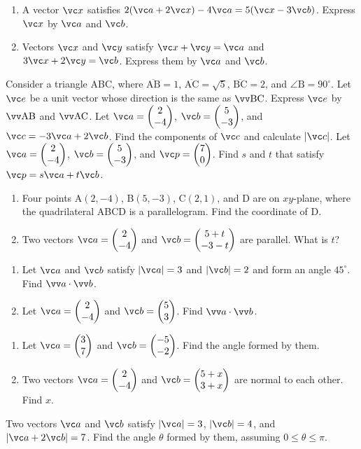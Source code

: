 \documentclass[11pt,pdfa,lastpage]{MishoNote}
\begin{document}
\begin{enumerate}[start=3]
\itemA
\begin{enumerate}[leftmargin=1.5em,labelsep=-0.3em]
  \item A vector $\vc x$ satisfies $2(\vc a+2\vc x)-4\vc a=5(\vc x-3\vc b)$. Express $\vc x$ by $\vc a$ and $\vc b$.
 \item Vectors $\vc x$ and $\vc y$ satisfy $\vc x+\vc y=\vc a$ and $3\vc x+2\vc y=\vc b$. Express them by $\vc a$ and $\vc b$.
\end{enumerate}
\itemA Consider a triangle ABC, where $\overline{\mathrm{AB}}=1$, $\overline{\mathrm{AC}}=\sqrt5$, $\overline{\mathrm{BC}}=2$, and $\angle{\mathrm B}=90^\circ$.
Let $\vc e$ be a unit vector whose direction is the same as $\vvv{BC}$. Express $\vc e$ by $\vvv{AB}$ and $\vvv{AC}$.
 \itemA Let $\vc a=\pmat{2\\-4}$, $\vc b=\pmat{5\\ -3}$, and $\vc c=-3\vc a+2\vc b$. Find the components of $\vc c$ and calculate $|\vc c|$.
 \itemB Let $\vc a=\pmat{2\\-4}$, $\vc b=\pmat{5\\ -3}$, and $\vc p=\pmat{7\\0}$. Find $s$ and $t$ that satisfy $\vc p=s\vc a+t\vc b$.
\itemB
\begin{enumerate}[leftmargin=1.5em,labelsep=-0.3em]
\item Four points A$(2,-4)$, B$(5,-3)$, C$(2,1)$, and D are on $xy$-plane, where the quadrilateral ABCD is a parallelogram. Find the coordinate of D.
\item Two vectors $\vc a=\pmat{2\\-4}$ and $\vc b=\pmat{5+t\\-3-t}$ are parallel. What is $t$?
\end{enumerate}
\itemA
\begin{enumerate}[leftmargin=1.5em,labelsep=-0.3em]
\item Let $\vc a$ and $\vc b$ satisfy $|\vc a|=3$ and $|\vc b|=2$ and form an angle $45^\circ$. Find $\vipro a b$.
\item Let $\vc a=\pmat{2\\-4}$ and $\vc b=\pmat{5\\3}$. Find $\vipro ab$.
\end{enumerate}
\itemA
\begin{enumerate}[leftmargin=1.5em,labelsep=-0.3em]
\item Let $\vc a=\pmat{3\\7}$ and $\vc b=\pmat{-5\\-2}$. Find the angle formed by them.
\item Two vectors $\vc a=\pmat{2\\-4}$ and $\vc b=\pmat{5+x\\3+x}$ are normal to each other. Find $x$.
\end{enumerate}
\itemB Two vectors $\vc a$ and $\vc b$ satisfy $|\vc a|=3$, $|\vc b|=4$, and $|\vc a+2\vc b|=7$. Find the angle $\theta$ formed by them, assuming $0\le\theta\le\pi$.


\end{enumerate}
\end{document}
